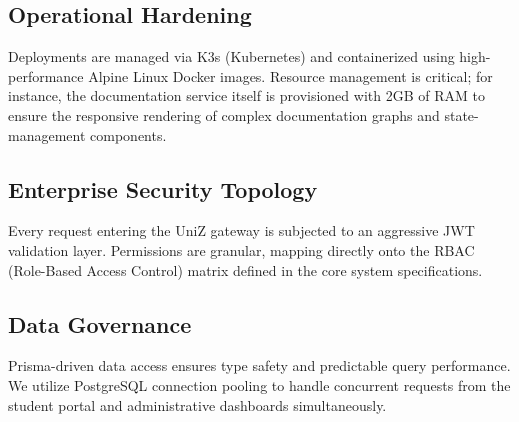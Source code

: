 \subsection{Operational Hardening}
Deployments are managed via K3s (Kubernetes) and containerized using high-performance Alpine Linux Docker images. 
Resource management is critical; for instance, the documentation service itself is provisioned with 2GB of RAM to ensure the responsive rendering of complex documentation graphs and state-management components.

\subsection{Enterprise Security Topology}
Every request entering the UniZ gateway is subjected to an aggressive JWT validation layer. 
Permissions are granular, mapping directly onto the RBAC (Role-Based Access Control) matrix defined in the core system specifications.

\subsection{Data Governance}
Prisma-driven data access ensures type safety and predictable query performance. 
We utilize PostgreSQL connection pooling to handle concurrent requests from the student portal and administrative dashboards simultaneously.
